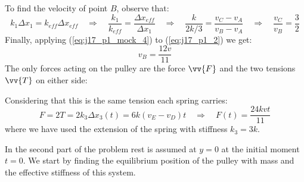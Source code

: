 To find the velocity of point $B$, observe that:
\begin{equation*}
	k_1 \Delta x_1 = k_{eff} \Delta x_{eff}
	\quad\Rightarrow\quad
	\frac{k_1}{k_{eff}} = \frac{\Delta x_{eff}}{\Delta x_1}
	\quad\Rightarrow\quad
	\frac{k}{2k/3} = \frac{v_C - v_A}{v_B - v_A}
	\quad\Rightarrow\quad
	\boxed{\frac{v_C}{v_B} = \frac{3}{2}}
	\tag{$\star$}
	\label{eq:j17_p1_mock_4}
\end{equation*}
Finally, applying (\ref{eq:j17_p1_mock_4}) to (\ref{eq:j17_p1_2}) we get:
\begin{equation*}
	\boxed{v_B = \frac{12v}{11}}
	\tag{$4$}
	\label{eq:j17_p1_4}
\end{equation*}
\newpage
The only forces acting on the pulley are the force $\vv{F}$ and the two tensions $\vv{T}$ on either side:
\\[-0.8\baselineskip]
\begin{minipage}[t][75pt]{\textwidth}
	\vspace{0pt}
	
	\begin{minipage}[t][72.86pt]{0.84\textwidth}
		\vspace{7pt}
		Considering that this is the same tension each spring carries:
		\begin{equation*}
			F = 2T = 2 k_3 \Delta x_3(t) = 6k (v_E - v_D) t
			\quad\Rightarrow\quad
			\boxed{F(t) = \frac{24kvt}{11}}
			\tag{$5$}
			\label{eq:j17_p1_5}
		\end{equation*}
		where we have used the extension of the spring with stiffness $k_3 = 3k$.
	\end{minipage}
\end{minipage}

In the second part of the problem rest is assumed at $y=0$ at the initial moment $t=0$. We start by finding the equilibrium position of the pulley with mass and the effective stiffness of this system.

